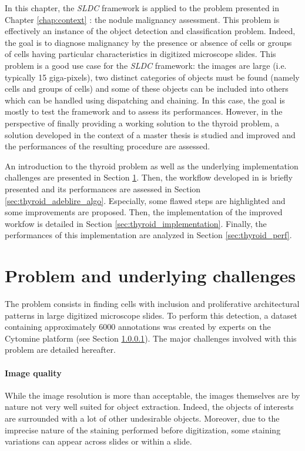 \label{chap:thyroid}
In this chapter, the \textit{SLDC} framework is applied to the problem presented in Chapter \ref{chap:context} : the nodule malignancy assessment. This problem is effectively an instance of the object detection and classification problem. Indeed, the goal is to diagnose malignancy by the presence or absence of cells or groups of cells having particular characteristics in digitized microscope slides. This problem is a good use case for the \textit{SLDC} framework: the images are large (i.e. typically 15 giga-pixels), two distinct categories of objects must be found (namely cells and groups of cells) and some of these objects can be included into others which can be handled using dispatching and chaining. In this case, the goal is mostly to test the framework and to assess its performances. However, in the perspective of finally providing a working solution to the thyroid problem, a solution developed in the context of a master thesis is studied and improved and the performances of the resulting procedure are assessed.  

An introduction to the thyroid problem as well as the underlying implementation challenges are presented in Section \ref{sec:thyroid_impl_issue}. Then, the workflow developed in \cite{adeblire2013} is briefly presented and its performances are assessed in Section \ref{sec:thyroid_adeblire_algo}. Especially, some flawed steps are highlighted and some improvements are proposed. Then, the implementation of the improved workfow is detailed in Section \ref{sec:thyroid_implementation}. Finally, the performances of this implementation are analyzed in Section \ref{sec:thyroid_perf}.

\section{Problem and underlying challenges}
\label{sec:thyroid_impl_issue}
The problem consists in finding cells with inclusion and proliferative architectural patterns in large digitized microscope slides. To perform this detection, a dataset containing approximately 6000 annotations was created by experts on the Cytomine platform (see Section \ref{}). The major challenges involved with this problem are detailed hereafter. 

\paragraph{Image quality} While the image resolution is more than acceptable, the images themselves are by nature not very well suited for object extraction. Indeed, the objects of interests are surrounded with a lot of other undesirable objects. Moreover, due to the imprecise nature of the staining performed before digitization, some staining variations can appear across slides or within a slide. 

